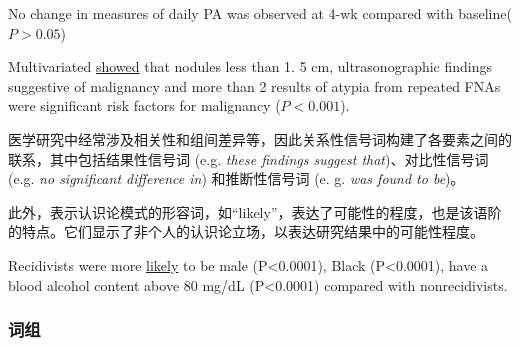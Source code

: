 \documentclass[a4paper]{ctexbook}
\begin{document}
    \begin{eg}{}
      No change in measures of daily PA was observed at 4-wk compared with baseline($P>0.05$)   
    \end{eg}

    \begin{eg}{}
      Multivariated  \uline{showed} that nodules less than 1. 5 cm, ultrasonographic findings suggestive of malignancy and more than 2 results of atypia from repeated FNAs were significant risk factors for malignancy ($P<0.001$).  
    \end{eg}

    医学研究中经常涉及相关性和组间差异等，因此关系性信号词构建了各要素之间的联系，其中包括结果性信号词 (e.g. \emph{these findings suggest that})、对比性信号词(e.g. \emph{no significant difference in}) 和推断性信号词 (e. g. \emph{was found to be})。

    此外，表示认识论模式的形容词，如“likely”，表达了可能性的程度，也是该语阶的特点。它们显示了非个人的认识论立场，以表达研究结果中的可能性程度。

    \begin{eg}{}
      Recidivists were more \uline{likely} to be male (P<0.0001), Black (P<0.0001), have a blood alcohol content above 80 mg/dL (P<0.0001) compared with nonrecidivists.  
    \end{eg}

    \subsubsection{词组}
\end{document}
